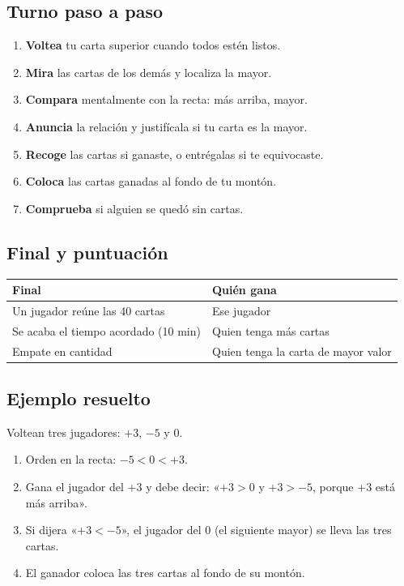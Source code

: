 \documentclass[12pt, letterpaper]{article}
\begin{document}
\subsection{Turno paso a paso}

\begin{enumerate}[leftmargin=*]
  \item \textbf{Voltea} tu carta superior cuando todos estén listos.
  \item \textbf{Mira} las cartas de los demás y localiza la mayor.
  \item \textbf{Compara} mentalmente con la recta: más arriba, mayor.
  \item \textbf{Anuncia} la relación y justifícala si tu carta es la mayor.
  \item \textbf{Recoge} las cartas si ganaste, o entrégalas si te equivocaste.
  \item \textbf{Coloca} las cartas ganadas al fondo de tu montón.
  \item \textbf{Comprueba} si alguien se quedó sin cartas.
\end{enumerate}

\subsection{Final y puntuación}

\begin{center}
\small
\begin{tabular}{@{}p{7.4cm} p{6.6cm}@{}}
\toprule
\textbf{Final} & \textbf{Quién gana}\\
\midrule
Un jugador reúne las 40 cartas & Ese jugador\\
Se acaba el tiempo acordado (10 min) & Quien tenga más cartas\\
Empate en cantidad & Quien tenga la carta de mayor valor\\
\bottomrule
\end{tabular}
\end{center}

\subsection{Ejemplo resuelto}

Voltean tres jugadores: $+3$, $-5$ y $0$.

\begin{cuadrosolucion}
\begin{enumerate}[leftmargin=*]
  \item Orden en la recta: $-5<0<+3$.
  \item Gana el jugador del $+3$ y debe decir: «$+3>0$ y $+3>-5$, porque $+3$ está más arriba».
  \item Si dijera «$+3<-5$», el jugador del $0$ (el siguiente mayor) se lleva las tres cartas.
  \item El ganador coloca las tres cartas al fondo de su montón.
\end{enumerate}
\end{cuadrosolucion}
\end{document}
